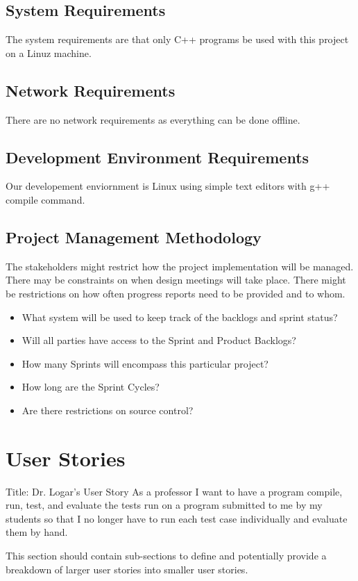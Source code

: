 \subsection{System  Requirements}
The system requirements are that only C++ programs be used with this project on a Linuz machine.


\subsection{Network Requirements}
There are no network requirements as everything can be done offline.


\subsection{Development Environment Requirements}
Our developement enviornment is Linux using simple text editors with g++ compile command.


\subsection{Project  Management Methodology}
The stakeholders might restrict how the project implementation will be managed. 
 There may be constraints on when design meetings will take place.  There might 
be restrictions on how often progress reports need to be provided and to whom. 
 
\begin{itemize}
\item What system will be used to keep track of the backlogs and sprint status?
\item Will all parties have access to the Sprint and Product Backlogs?
\item How many Sprints will encompass this particular project?
\item How long are the Sprint Cycles?
\item Are there restrictions on source control? 
\end{itemize}

\section{User Stories}
 Title: Dr. Logar's User Story
As a professor I want to have a program compile, run, test, and evaluate the tests run on a program submitted to me by 
my students so that I no longer have to run each test case individually and evaluate them by hand.

This section should contain sub-sections to define and potentially provide a breakdown 
of larger user stories into smaller user stories. 



